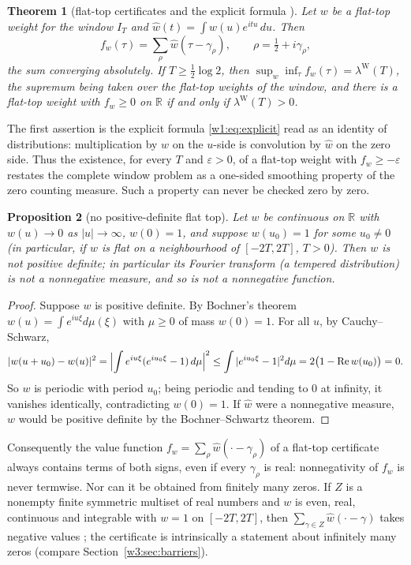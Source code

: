 \documentclass[11pt]{amsart}
\newtheorem{theorem}{Theorem}[section]
\newtheorem{proposition}[theorem]{Proposition}
\theoremstyle{definition}
\theoremstyle{remark}
\numberwithin{equation}{section}
\newcommand{\R}{\mathbb{R}}
\DeclareMathOperator{\Rel}{Re}
\newcommand{\IT}{I_T}                                  %
\newcommand{\lamW}{\lambda^{\mathrm W}(T)}             %
\begin{document}
\begin{theorem}[flat-top certificates and the explicit formula {\cite[Theorems~6.2, 6.4 and~8.2]{P46}}]\label{w5:obs:flattop}
Let $w$ be a flat-top weight for the window $\IT$ and $\widehat w(t)=\int w(u)e^{itu}\,du$. Then
\[
  f_w(\tau)=\sum_\rho\widehat w(\tau-\gamma_\rho),\qquad\rho=\tfrac12+i\gamma_\rho ,
\]
the sum converging absolutely. If $T\ge\frac12\log2$, then $\sup_w\inf_\tau f_w(\tau)=\lamW$, the supremum being taken over
the flat-top weights of the window, and there is a flat-top weight with $f_w\ge0$ on $\R$ if and only if $\lamW>0$.
\end{theorem}

The first assertion is the explicit formula \eqref{w1:eq:explicit} read as an identity of distributions:
multiplication by $w$ on the $u$-side is convolution by $\widehat w$ on the zero side. Thus the existence, for every $T$
and $\varepsilon>0$, of a flat-top weight with $f_w\ge-\varepsilon$ restates the complete window problem as a one-sided
smoothing property of the zero counting measure. Such a property can never be checked zero by zero.

\begin{proposition}[no positive-definite flat top]\label{w5:prop:noPD}
Let $w$ be continuous on $\R$ with $w(u)\to0$ as $|u|\to\infty$, $w(0)=1$, and suppose $w(u_0)=1$ for some $u_0\ne0$
(in particular, if $w$ is flat on a neighbourhood of $[-2T,2T]$, $T>0$). Then $w$ is not positive definite; in particular its
Fourier transform (a tempered distribution) is not a nonnegative measure, and so is not a nonnegative function.
\end{proposition}

\begin{proof}
Suppose $w$ is positive definite. By Bochner's theorem $w(u)=\int e^{iu\xi}d\mu(\xi)$ with $\mu\ge0$ of mass $w(0)=1$.
For all $u$, by Cauchy--Schwarz,
\[
  |w(u+u_0)-w(u)|^2=\Bigl|\int e^{iu\xi}(e^{iu_0\xi}-1)\,d\mu\Bigr|^2\le\int|e^{iu_0\xi}-1|^2d\mu=2\bigl(1-\Rel w(u_0)\bigr)=0 .
\]
So $w$ is periodic with period $u_0$; being periodic and tending to $0$ at infinity, it vanishes identically, contradicting $w(0)=1$. If
$\widehat w$ were a nonnegative measure, $w$ would be positive definite by the Bochner--Schwartz theorem.
\end{proof}

Consequently the value function $f_w=\sum_\rho\widehat w(\cdot-\gamma_\rho)$ of a flat-top certificate always contains
terms of both signs, even if every $\gamma_\rho$ is real: nonnegativity of $f_w$ is never termwise. Nor can it be
obtained from finitely many zeros. If $Z$ is a nonempty finite symmetric multiset of real numbers and $w$ is even, real,
continuous and integrable with $w=1$ on $[-2T,2T]$, then $\sum_{\gamma\in Z}\widehat w(\cdot-\gamma)$ takes negative
values \cite[Theorem~6.5]{P46}; the certificate is intrinsically a statement about infinitely many zeros
(compare Section~\ref{w3:sec:barriers}).
\end{document}

